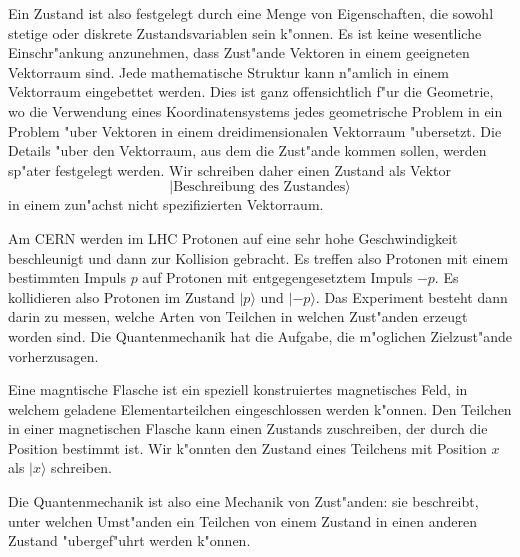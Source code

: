 Ein Zustand ist also festgelegt durch eine Menge von Eigenschaften,
die sowohl stetige oder diskrete Zustandsvariablen sein k"onnen.
Es ist keine wesentliche Einschr"ankung anzunehmen, dass Zust"ande
Vektoren in einem geeigneten Vektorraum sind.
Jede mathematische Struktur kann n"amlich in einem Vektorraum eingebettet
werden. Dies ist ganz offensichtlich f"ur die Geometrie, wo die Verwendung
eines Koordinatensystems jedes geometrische Problem in ein Problem "uber
Vektoren in einem dreidimensionalen Vektorraum "ubersetzt. Die Details "uber den
Vektorraum, aus dem die Zust"ande kommen sollen, werden sp"ater festgelegt
werden. Wir schreiben daher einen Zustand als Vektor
\[
|\text{Beschreibung des Zustandes}\rangle
\]
in einem zun"achst nicht spezifizierten Vektorraum.

Am CERN werden im LHC Protonen auf eine sehr hohe Geschwindigkeit 
beschleunigt und dann zur Kollision gebracht. Es treffen also
Protonen mit einem bestimmten Impuls $p$ auf Protonen mit entgegengesetztem
Impuls $-p$. Es kollidieren also Protonen im Zustand $|p\rangle$ und
$|\text{$-p$}\rangle$. Das Experiment besteht dann darin zu messen, welche Arten von
Teilchen in welchen Zust"anden erzeugt worden sind.
Die Quantenmechanik hat
die Aufgabe, die m"oglichen Zielzust"ande vorherzusagen.

%
Eine magntische Flasche ist ein speziell konstruiertes magnetisches Feld,
in welchem geladene Elementarteilchen eingeschlossen werden k"onnen.
Den Teilchen in einer magnetischen Flasche kann einen Zustands zuschreiben,
der durch die Position bestimmt ist.
Wir k"onnten den Zustand eines Teilchens mit Position $x$ als $|x\rangle$
schreiben.

Die Quantenmechanik ist also eine Mechanik von Zust"anden: sie beschreibt,
unter welchen Umst"anden ein Teilchen von einem Zustand in einen anderen
Zustand "ubergef"uhrt werden k"onnen. 

